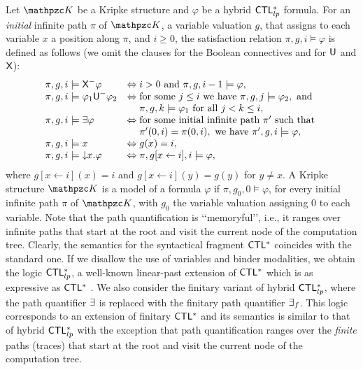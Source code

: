 Let $\Ku$ be a Kripke structure and $\varphi$ be a hybrid $\text{\sffamily CTL$^{*}_{lp}$}$ formula. For an \emph{initial}  infinite path $\pi$ of $\Ku$, a variable valuation $g$, that assigns to each  variable $x$  a position along $\pi$, and  $i\geq 0$, the satisfaction relation %
$\pi,g, i\models  \varphi$ %
is defined as follows (we omit the clauses for the Boolean connectives and for $\textsf{U}$ and $\textsf{X}$):
%
\[ \begin{array}{ll}
\pi, g,i \models \textsf{X}^{-} \varphi  & \Leftrightarrow  i>0 \text{ and } \pi, g, i-1 \models \varphi ,\\
 \pi, g, i \models \varphi_1\textsf{U}^{-} \varphi_2  &
  \Leftrightarrow  \text{for some $j\leq i$ we have } \pi, g, j
  \models \varphi_2,
  \text{ and }  \\
  & \phantom{\Leftrightarrow}\; \pi, g, k \models  \varphi_1 \text{ for all }j< k\leq i,\\
\pi, g, i \models \exists \varphi  & \Leftrightarrow \text{for some initial infinite path } \pi'  \text{ such that } \\
& \phantom{\Leftrightarrow }\; \pi'(0,i)=\pi(0,i), \text{ we have } \pi', g, i \models \varphi,\\
\pi,g, i \models x  &  \Leftrightarrow  g(x)=i,\\
\pi,g, i \models \text{$\downarrow$$x$}.\varphi  &  \Leftrightarrow  \pi,g[x\leftarrow i], i \models \varphi,
\end{array} \]
%
where $g[x\leftarrow i](x)=i$ and $g[x\leftarrow i](y)=g(y)$ for $y\neq x$.  A Kripke structure $\Ku$ is a model of a formula $\varphi$ if  $\pi,g_0, 0 \models \varphi$, for every initial infinite path $\pi$ of $\Ku$, with $g_0$ the variable valuation assigning $0$ to each variable. Note that the path quantification is \lq\lq memoryful\rq\rq ,
i.e., it  ranges over infinite paths that start at the root and visit  the current node of the computation tree. Clearly, the semantics for the syntactical fragment
$\text{\sffamily CTL$^{*}$}$ coincides with the standard one. 
%
If we disallow the use of variables and binder modalities, we obtain the  logic
$\text{\sffamily CTL$^{*}_{lp}$}$, a well-known linear-past extension of $\text{\sffamily CTL$^{*}$}$ which is as expressive as $\text{\sffamily CTL$^{*}$}$ \cite{jcss/KupfermanPV12}.
We also consider the finitary variant of hybrid $\text{\sffamily CTL$^{*}_{lp}$}$, where the path quantifier $\exists$ is replaced with the finitary path quantifier $\exists_f$. This logic corresponds to an extension of finitary $\text{\sffamily CTL$^{*}$}$ and its semantics is similar to that of hybrid $\text{\sffamily CTL$^{*}_{lp}$}$ with the exception that path quantification ranges over the \emph{finite} paths (traces) that start at the root and visit the current node of the computation tree.

